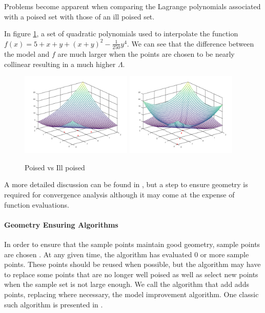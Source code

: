 Problems become apparent when comparing the Lagrange polynomials associated with a poised set with those of an ill poised set.

In figure \cref{pvip}, a set of quadratic polynomials used to interpolate the function $f(x) = 5 + x + y + (x + y) ^ 2 - \frac 1 {250} y ^ 4$.
We can see that the difference between the model and $f$ are much larger when the points are chosen to be nearly collinear resulting in a much higher $\Lambda$.

\begin{figure}[h]
    \centering
    \includegraphics[width=200px]{images/poised_good.png}
    \includegraphics[width=200px]{images/poised_bad.png}
    \caption{Poised vs Ill poised}
    \label{pvip}
\end{figure}


\begin{center}

\end{center}

A more detailed discussion can be found in \cite{doi:10.1080/10556780802409296}, but a step to ensure geometry is required for convergence analysis although it may come at the expense of function evaluations.

\paragraph{Geometry Ensuring Algorithms}

In order to ensure that the sample points maintain good geometry, sample points are chosen .
At any given time, the algorithm has evaluated 0 or more sample points.
These points should be reused when possible, but the algorithm may have to replace some points that are no longer well poised as well as select new points when the sample set is not large enough.
We call the algorithm that add adds points, replacing where necessary, the model improvement algorithm.
One classic such algorithm is presented in \cite{DUMMY:intro_book}.

